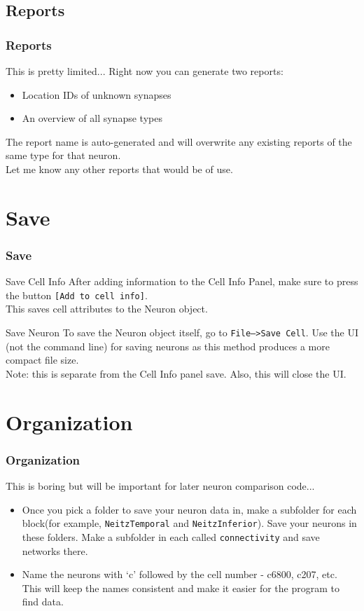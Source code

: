 \documentclass[11pt]{beamer}
\begin{document}
\subsection{Reports}
	\begin{frame}
		\frametitle{Reports}
		This is pretty limited... Right now you can generate two reports:
		\begin{itemize} 
			\item Location IDs of unknown synapses
			\item An overview of all synapse types
		\end{itemize}
		The report name is auto-generated and will overwrite any existing reports of the same type for that neuron.\\Let me know any other reports that would be of use.
	\end{frame}
\section{Save}
	\begin{frame}
		\frametitle{Save}
		\begin{block}{Save Cell Info}
			After adding information to the Cell Info Panel, make sure to press the button \texttt{[Add to cell info]}.\\ This saves cell attributes to the Neuron object.
		\end{block}
		\begin{block}{Save Neuron}
			To save the Neuron object itself, go to \texttt{File-->Save Cell}. Use the UI (not the command line) for saving neurons as this method produces a more compact file size.\\ Note: this is separate from the Cell Info panel save. Also, this will close the UI.  
		\end{block}
	\end{frame}
\section{Organization}
\begin{frame}
	\frametitle{Organization}
	This is boring but will be important for later neuron comparison code...
	\begin{itemize}
		\item Once you pick a folder to save your neuron data in, make a subfolder for each block(for example, \texttt{NeitzTemporal} and \texttt{NeitzInferior}). Save your neurons in these folders. Make a subfolder in each called \texttt{connectivity} and save networks there.
		\item Name the neurons with `c' followed by the cell number - c6800, c207, etc. This will keep the names consistent and make it easier for the program to find data.
	\end{itemize}
\end{frame}
\end{document}
